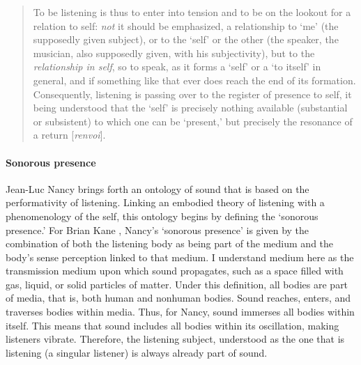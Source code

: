 \begin{quote}
	To be listening is thus to enter into tension and to be on the lookout for a relation to self: \textit{not} it should be emphasized, a relationship to `me' (the supposedly given subject), or to the `self' or the other (the speaker, the musician, also supposedly given, with his subjectivity), but to the \textit{relationship in self}, so to speak, as it forms a `self' or a `to itself' in general, and if something like that ever does reach the end of its formation. Consequently, listening is passing over to the register of presence to self, it being understood that the `self' is precisely nothing available (substantial or subsistent) to which one can be `present,' but precisely the resonance of a return [\textit{renvoi}]. \parencite[12]{Nan07:Lis}
\end{quote} %

\paragraph{Sonorous presence}
Jean-Luc Nancy \parencite{Nan07:Lis} brings forth an ontology of sound that is based on the performativity of listening. Linking an embodied theory of listening with a phenomenology of the self, this ontology begins by defining the `sonorous presence.' For Brian Kane \parencite{Gra15:The}, Nancy's `sonorous presence' is given by the combination of both the listening body as being part of the medium and the body's sense perception linked to that medium. I understand medium here as the transmission medium upon which sound propagates, such as a space filled with gas, liquid, or solid particles of matter. Under this definition, all bodies are part of media, that is, both human and nonhuman bodies. Sound reaches, enters, and traverses bodies within media. Thus, for Nancy, sound immerses all bodies within itself. This means that sound includes all bodies within its oscillation, making listeners vibrate. Therefore, the listening subject, understood as the one that is listening (a singular listener) is always already part of sound. 

